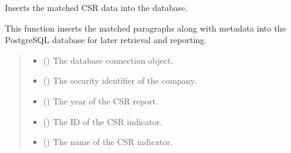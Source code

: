 \documentclass[letterpaper,10pt,english]{sphinxmanual}
\begin{document}

\begin{fulllineitems}
\label{\detokenize{modules.data_storage:modules.data_storage.retry_failed_reports.insert_matched_data}}
\pysigstartsignatures
\pysiglinewithargsret
{}
{\sphinxparamcomma {}\sphinxparamcomma {}\sphinxparamcomma {}\sphinxparamcomma {}\sphinxparamcomma {}\sphinxparamcomma {}}
{}
\pysigstopsignatures
\sphinxAtStartPar
Inserts the matched CSR data into the database.

\sphinxAtStartPar
This function inserts the matched paragraphs along with metadata into the
PostgreSQL database for later retrieval and reporting.
\begin{quote}\begin{description}
\begin{itemize}
\item {} 
\sphinxAtStartPar
{} () \textendash{} The database connection object.

\item {} 
\sphinxAtStartPar
{} () \textendash{} The security identifier of the company.

\item {} 
\sphinxAtStartPar
{} () \textendash{} The year of the CSR report.

\item {} 
\sphinxAtStartPar
{} () \textendash{} The ID of the CSR indicator.

\item {} 
\sphinxAtStartPar
{} () \textendash{} The name of the CSR indicator.


\end{itemize}
\end{description}
\end{quote}
\end{fulllineitems}
\end{document}
